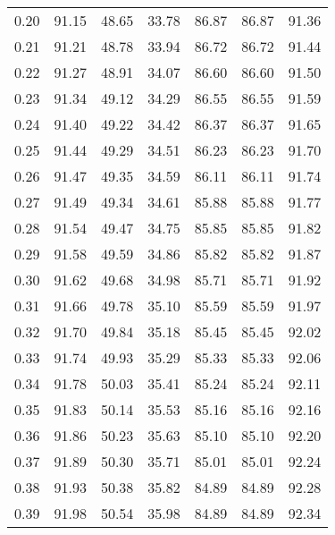 \begin{tabular}{|c|c|c|c|c|c|c|}
      0.20 &     91.15 &     48.65 &      33.78 &   86.87 &      86.87 &         91.36 \\
      0.21 &     91.21 &     48.78 &      33.94 &   86.72 &      86.72 &         91.44 \\
      0.22 &     91.27 &     48.91 &      34.07 &   86.60 &      86.60 &         91.50 \\
      0.23 &     91.34 &     49.12 &      34.29 &   86.55 &      86.55 &         91.59 \\
      0.24 &     91.40 &     49.22 &      34.42 &   86.37 &      86.37 &         91.65 \\
      0.25 &     91.44 &     49.29 &      34.51 &   86.23 &      86.23 &         91.70 \\
      0.26 &     91.47 &     49.35 &      34.59 &   86.11 &      86.11 &         91.74 \\
      0.27 &     91.49 &     49.34 &      34.61 &   85.88 &      85.88 &         91.77 \\
      0.28 &     91.54 &     49.47 &      34.75 &   85.85 &      85.85 &         91.82 \\
      0.29 &     91.58 &     49.59 &      34.86 &   85.82 &      85.82 &         91.87 \\
      0.30 &     91.62 &     49.68 &      34.98 &   85.71 &      85.71 &         91.92 \\
      0.31 &     91.66 &     49.78 &      35.10 &   85.59 &      85.59 &         91.97 \\
      0.32 &     91.70 &     49.84 &      35.18 &   85.45 &      85.45 &         92.02 \\
      0.33 &     91.74 &     49.93 &      35.29 &   85.33 &      85.33 &         92.06 \\
      0.34 &     91.78 &     50.03 &      35.41 &   85.24 &      85.24 &         92.11 \\
      0.35 &     91.83 &     50.14 &      35.53 &   85.16 &      85.16 &         92.16 \\
      0.36 &     91.86 &     50.23 &      35.63 &   85.10 &      85.10 &         92.20 \\
      0.37 &     91.89 &     50.30 &      35.71 &   85.01 &      85.01 &         92.24 \\
      0.38 &     91.93 &     50.38 &      35.82 &   84.89 &      84.89 &         92.28 \\
      0.39 &     91.98 &     50.54 &      35.98 &   84.89 &      84.89 &         92.34 \\

\end{tabular}
